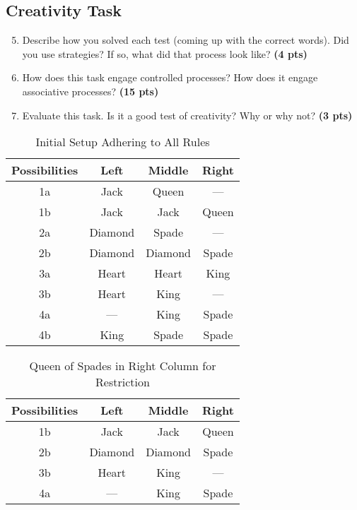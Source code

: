 \documentclass[stu,12pt,floatsintext]{apa7}
\newenvironment{solution}
  {\textit{\textbf{Solution.}}}
\newcommand{\sol}[1]{
    \begin{customframedproof}
        \begin{solution}
        #1
        \end{solution}
    \end{customframedproof}
}
\begin{document}
\subsection{Creativity Task}

\begin{enumerate}
	\setcounter{enumi}{4}
	\item Describe how you solved each test (coming up with the correct words). Did you use strategies? If so, what did that process look like? \textbf{(4 pts)} \\[0.25cm]
	\sol{
		
	}
	\item How does this task engage controlled processes? How does it engage associative processes? \textbf{(15 pts)}\\[0.25cm]
	\sol{
		
	}
	\item Evaluate this task. Is it a good test of creativity? Why or why not? \textbf{(3 pts)}\\[0.25cm]
	\sol{
		
	}
\end{enumerate}

\newpage

\begin{table}[h!]
	\centering
	\begin{tabular}{cccc}
		\toprule
		\textbf{Possibilities} & \textbf{Left} & \textbf{Middle} & \textbf{Right} \\ \midrule
		1a & Jack & Queen & --- \\ \midrule
		1b & Jack & Jack & Queen \\ \midrule
		2a & Diamond & Spade & --- \\ \midrule
		2b & Diamond & Diamond & Spade  \\ \midrule
		3a & Heart & Heart & King \\ \midrule
		3b & Heart & King & --- \\ \midrule
		4a & --- & King & Spade \\ \midrule
		4b & King & Spade & Spade \\ \bottomrule
	\end{tabular}
	\vspace{0.25cm}
	\caption{Initial Setup Adhering to All Rules}\label{tab:table1}
\end{table}

\begin{table}[h!]
	\centering
	\begin{tabular}{cccc}
		\toprule
		\textbf{Possibilities} & \textbf{Left} & \textbf{Middle} & \textbf{Right} \\ \midrule
		1b & Jack & Jack & Queen \\ \midrule
		2b & Diamond & Diamond & Spade  \\ \midrule
		3b & Heart & King & --- \\ \midrule
		4a & --- & King & Spade \\ \bottomrule
	\end{tabular}
	\vspace{0.25cm}
	\caption{Queen of Spades in Right Column for Restriction}\label{tab:table2}
\end{table}
\end{document}
